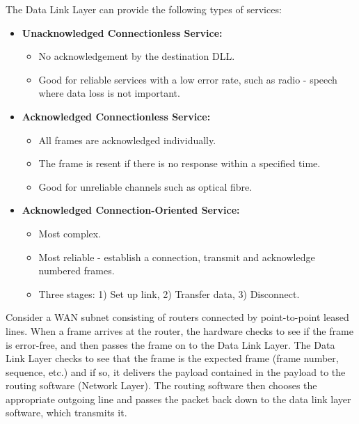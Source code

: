 \documentclass[11pt]{article}
\begin{document}
The Data Link Layer can provide the following types of services:
\begin{itemize}
    \item   \textbf{Unacknowledged Connectionless Service:}
                \begin{itemize}
                    \item   No acknowledgement by the destination DLL. 
                    \item   Good for reliable services with a low error rate, such as radio - speech where data loss is 
                            not important. 
                \end{itemize} 
    \item   \textbf{Acknowledged Connectionless Service:}
                \begin{itemize}
                    \item   All frames are acknowledged individually. 
                    \item   The frame is resent if there is no response within a specified time. 
                    \item   Good for unreliable channels such as optical fibre.
                \end{itemize}
    \item   \textbf{Acknowledged Connection-Oriented Service:}
                \begin{itemize}
                    \item   Most complex. 
                    \item   Most reliable - establish a connection, transmit and acknowledge numbered frames. 
                    \item   Three stages: 1) Set up link, 2) Transfer data, 3) Disconnect.
                \end{itemize}
\end{itemize}

Consider a WAN subnet consisting of routers connected by point-to-point leased lines. 
When a frame arrives at the router, the hardware checks to see if the frame is error-free, and then passes the frame on 
to the Data Link Layer. 
The Data Link Layer checks to see that the frame is the expected frame (frame number, sequence, etc.) and if so, it 
delivers the payload contained in the payload to the routing software (Network Layer). 
The routing software then chooses the appropriate outgoing line and passes the packet back down to the data link layer 
software, which transmits it. 
\end{document}
